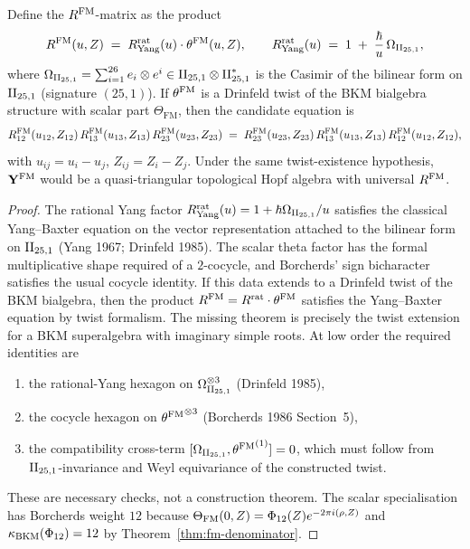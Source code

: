 \begin{conjecture}
\label{thm:fm-rmatrix}
\ClaimStatusConjectured
{}
Define the $R^{\mathrm{FM}}$-matrix as the product
\[
 R^{\mathrm{FM}}(u, Z) \;=\; R^{\mathrm{rat}}_{\mathrm{Yang}}(u) \cdot \theta^{\mathrm{FM}}(u, Z), \qquad R^{\mathrm{rat}}_{\mathrm{Yang}}(u) \;=\; 1 \;+\; \frac{\hbar}{u}\,\Omega_{\mathrm{II}_{25,1}},
\]
where $\Omega_{\mathrm{II}_{25,1}} = \sum_{i=1}^{26} e_i\otimes e^i\in \mathrm{II}_{25,1}\otimes \mathrm{II}_{25,1}^*$ is the Casimir of the bilinear form on $\mathrm{II}_{25,1}$ (signature $(25,1)$). If $\theta^{\mathrm{FM}}$ is a Drinfeld twist of the BKM bialgebra structure with scalar part $\Theta_{\mathrm{FM}}$, then the candidate equation is
\[
 R^{\mathrm{FM}}_{12}(u_{12}, Z_{12})\, R^{\mathrm{FM}}_{13}(u_{13}, Z_{13})\, R^{\mathrm{FM}}_{23}(u_{23}, Z_{23}) \;=\; R^{\mathrm{FM}}_{23}(u_{23}, Z_{23})\, R^{\mathrm{FM}}_{13}(u_{13}, Z_{13})\, R^{\mathrm{FM}}_{12}(u_{12}, Z_{12}),
\]
with $u_{ij} = u_i - u_j$, $Z_{ij} = Z_i - Z_j$. Under the same twist-existence hypothesis, $\mathbf{Y}^{\mathrm{FM}}$ would be a quasi-triangular topological Hopf algebra with universal $R^{\mathrm{FM}}$.
\end{conjecture}

\begin{proof}
The rational Yang factor $R^{\mathrm{rat}}_{\mathrm{Yang}}(u) = 1 + \hbar\Omega_{\mathrm{II}_{25,1}}/u$ satisfies the classical Yang--Baxter equation on the vector representation attached to the bilinear form on $\mathrm{II}_{25,1}$ (Yang 1967; Drinfeld 1985). The scalar theta factor has the formal multiplicative shape required of a $2$-cocycle, and Borcherds' sign bicharacter satisfies the usual cocycle identity. If this data extends to a Drinfeld twist of the BKM bialgebra, then the product $R^{\mathrm{FM}}=R^{\mathrm{rat}}\cdot\theta^{\mathrm{FM}}$ satisfies the Yang--Baxter equation by twist formalism. The missing theorem is precisely the twist extension for a BKM superalgebra with imaginary simple roots. At low order the required identities are
\begin{enumerate}[label=\textup{(\roman*)}]
\item the rational-Yang hexagon on $\Omega_{\mathrm{II}_{25,1}}^{\otimes 3}$ (Drinfeld 1985),
\item the cocycle hexagon on ${\theta^{\mathrm{FM}}}^{\otimes 3}$ (Borcherds 1986 Section~5),
\item the compatibility cross-term $[\Omega_{\mathrm{II}_{25,1}},{\theta^{\mathrm{FM}}}^{(1)}]=0$, which must follow from $\mathrm{II}_{25,1}$-invariance and Weyl equivariance of the constructed twist.
\end{enumerate}
These are necessary checks, not a construction theorem. The scalar
specialisation has Borcherds weight $12$ because
$\Theta_{\mathrm{FM}}(0,Z)=\Phi_{12}(Z)e^{-2\pi i(\rho,Z)}$ and
$\kappa_{\mathrm{BKM}}(\Phi_{12})=12$ by Theorem~\ref{thm:fm-denominator}.
\end{proof}

